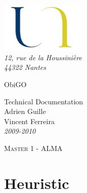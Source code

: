 \documentclass[11pt,a4paper]{report}
\begin{document}
\begin{titlepage}



	\begin{flushleft}
		 \includegraphics*[width=4cm]{logo.jpg} \\
		 \textsl{12, rue de la Houssinière}\\
		 \textit{44322 Nantes}
		\hrulefill
	\end{flushleft}


	\vspace{2cm}


	\begin{flushleft}

		{\fontsize{1.4cm}{1.65cm}\selectfont ObiGO  } 	 \\ 
	
		\vspace{1cm}
	
		{\Large Technical Documentation}\\
	
		\vspace{1cm}
		Adrien Guille \\
		Vincent Ferreira \\
		\textit{2009-2010}
	
	\end{flushleft}

	\vspace{2cm}

	\begin{flushleft}
	 	\textsc{Master 1 - ALMA}\\	
	 	\hrulefill
	\end{flushleft}


\end{titlepage}

\tableofcontents

\chapter*{Heuristic}
\end{document}
